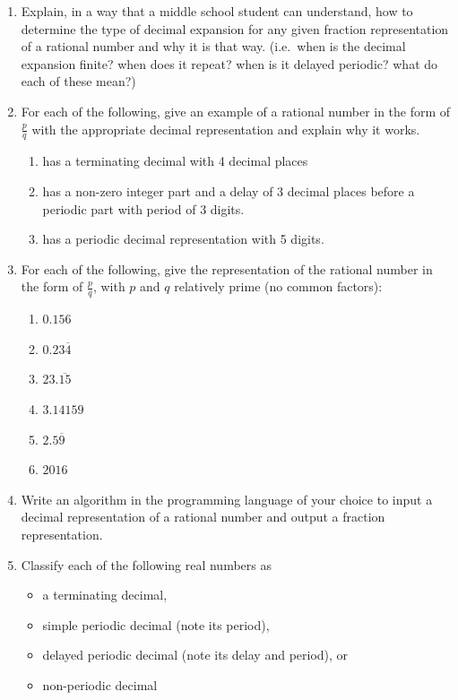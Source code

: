 \documentclass[
]{book}
\providecommand{\tightlist}{%
  \setlength{\itemsep}{0pt}\setlength{\parskip}{0pt}}
\theoremstyle{definition}
\theoremstyle{definition}
\theoremstyle{definition}
\theoremstyle{remark}
\begin{document}
\begin{enumerate}
\def\labelenumi{\arabic{enumi}.}
\item
  Explain, in a way that a middle school student can understand, how to determine the type of decimal expansion for any given fraction representation of a rational number and why it is that way. (i.e.~when is the decimal expansion finite? when does it repeat? when is it delayed periodic? what do each of these mean?)
\item
  For each of the following, give an example of a rational number in the form of \(\frac{p}{q}\) with the appropriate decimal representation and explain why it works.

  \begin{enumerate}
  \def\labelenumii{\alph{enumii}.}
  \tightlist
  \item
    has a terminating decimal with 4 decimal places
  \item
    has a non-zero integer part and a delay of 3 decimal places before a periodic part with period of 3 digits.
  \item
    has a periodic decimal representation with 5 digits.
  \end{enumerate}
\item
  For each of the following, give the representation of the rational number in the form of \(\frac{p}{q}\), with \(p\) and \(q\) relatively prime (no common factors):

  \begin{enumerate}
  \def\labelenumii{\alph{enumii}.}
  \tightlist
  \item
    \(0.156\)
  \item
    \(0.23\overline{4}\)
  \item
    \(23.\overline{15}\)
  \item
    \(3.14159\)
  \item
    \(2.5\overline{9}\)
  \item
    \(2016\)
  \end{enumerate}
\item
  Write an algorithm in the programming language of your choice to input a decimal representation of a rational number and output a fraction representation.
\item
  Classify each of the following real numbers as

  \begin{itemize}
  \tightlist
  \item
    a terminating decimal,
  \item
    simple periodic decimal (note its period),
  \item
    delayed periodic decimal (note its delay and period), or
  \item
    non-periodic decimal
  \end{itemize}


\end{enumerate}
\end{document}
